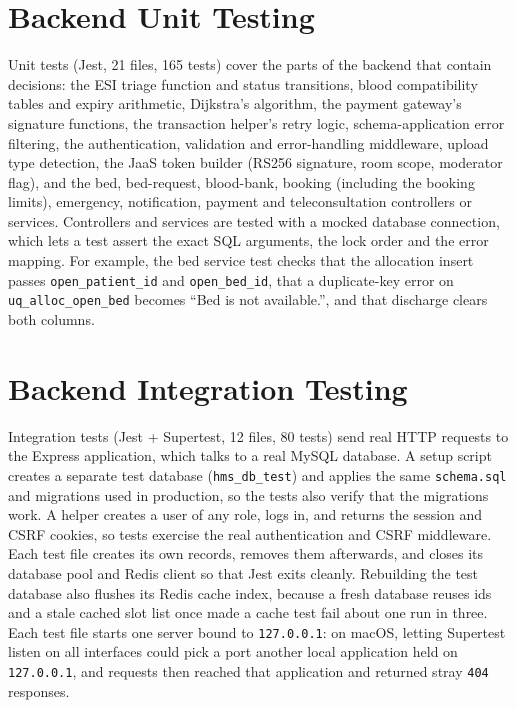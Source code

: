 \FloatBarrier
\section{Backend Unit Testing}

Unit tests (Jest, 21 files, 165 tests) cover the parts of the backend that contain decisions: the ESI triage function and status transitions, blood compatibility tables and expiry arithmetic, Dijkstra's algorithm, the payment gateway's signature functions, the transaction helper's retry logic, schema-application error filtering, the authentication, validation and error-handling middleware, upload type detection, the JaaS token builder (RS256 signature, room scope, moderator flag), and the bed, bed-request, blood-bank, booking (including the booking limits), emergency, notification, payment and teleconsultation controllers or services. Controllers and services are tested with a mocked database connection, which lets a test assert the exact SQL arguments, the lock order and the error mapping. For example, the bed service test checks that the allocation insert passes \texttt{open\_patient\_id} and \texttt{open\_bed\_id}, that a duplicate-key error on \texttt{uq\_alloc\_open\_bed} becomes ``Bed is not available.'', and that discharge clears both columns.

\FloatBarrier
\section{Backend Integration Testing}

Integration tests (Jest + Supertest, 12 files, 80 tests) send real HTTP requests to the Express application, which talks to a real MySQL database. A setup script creates a separate test database (\texttt{hms\_db\_test}) and applies the same \texttt{schema.sql} and migrations used in production, so the tests also verify that the migrations work. A helper creates a user of any role, logs in, and returns the session and CSRF cookies, so tests exercise the real authentication and CSRF middleware. Each test file creates its own records, removes them afterwards, and closes its database pool and Redis client so that Jest exits cleanly. Rebuilding the test database also flushes its Redis cache index, because a fresh database reuses ids and a stale cached slot list once made a cache test fail about one run in three. Each test file starts one server bound to \texttt{127.0.0.1}: on macOS, letting Supertest listen on all interfaces could pick a port another local application held on \texttt{127.0.0.1}, and requests then reached that application and returned stray \texttt{404} responses.

